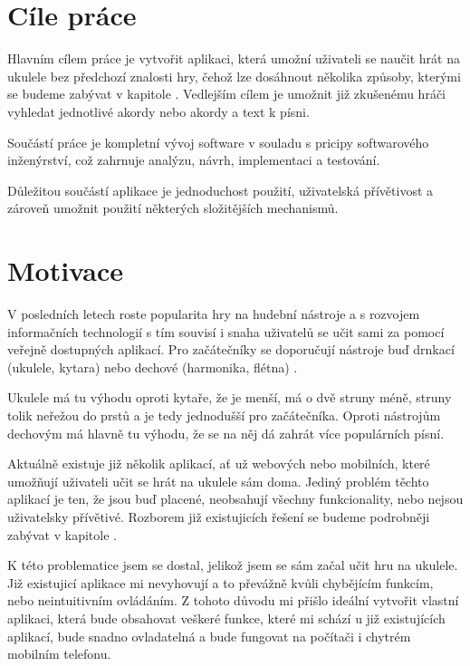 \begin{introduction}
    \label{ch:introduction}
    \section{Cíle práce}
    Hlavním cílem práce je vytvořit aplikaci, která umožní uživateli se naučit hrát na ukulele bez předchozí znalosti hry, čehož lze dosáhnout několika způsoby, kterými se budeme zabývat v kapitole . Vedlejším cílem je umožnit již zkušenému hráči vyhledat jednotlivé akordy nebo akordy a text k písni.

    Součástí práce je kompletní vývoj software v souladu s pricipy softwarového inženýrství, což zahrnuje analýzu, návrh, implementaci a testování.

    Důležitou součástí aplikace je jednoduchost použití, uživatelská přívětivost a zároveň umožnit použití některých složitějších mechanismů.
    
    \section{Motivace}
    V posledních letech roste popularita hry na hudební nástroje a s rozvojem informačních technologií s tím souvisí i snaha uživatelů se učit sami za pomocí veřejně dostupných aplikací. Pro začátečníky se doporučují nástroje buď drnkací (ukulele, kytara) nebo dechové (harmonika, flétna)\cite{s_2016_the} \cite{richardson_2019_top}.
    
    Ukulele má tu výhodu oproti kytaře, že je menší, má o dvě struny méně, struny tolik neřežou do prstů a je tedy jednodušší pro začátečníka. Oproti nástrojům dechovým má hlavně tu výhodu, že se na něj dá zahrát více populárních písní.

    Aktuálně existuje již několik aplikací, ať už webových nebo mobilních, které umožňují uživateli učit se hrát na ukulele sám doma. Jediný problém těchto aplikací je ten, že jsou buď placené, neobsahují všechny funkcionality, nebo nejsou uživatelsky přívětivé. Rozborem již existujicích řešení se budeme podrobněji zabývat v kapitole .

    K této problematice jsem se dostal, jelikož jsem se sám začal učit hru na ukulele. Již existujicí aplikace mi nevyhovují a to převážně kvůli chybějícím funkcím, nebo neintuitivním ovládáním. Z tohoto důvodu mi přišlo ideální vytvořit vlastní aplikaci, která bude obsahovat veškeré funkce, které mi schází u již existujících aplikací, bude snadno ovladatelná a bude fungovat na počítači i chytrém mobilním telefonu.


\end{introduction}
